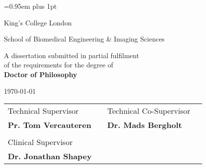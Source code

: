 \begin{titlepage}

\pagestyle{empty}


\vspace*{1.5cm}

\begin{center}
	{\LARGE{\theauthor}\par}
\end{center}
\vspace{0.6cm}
\begin{center}
        {\huge\baselineskip=0.95em plus 1pt \expandafter{
        \textbf{\thetitle}
        \par}}
\end{center}


\vspace{3cm}

\begin{center}
	\LARGE{\expandafter{\textrm{King's College London}}}\par
	\expandafter{\Large{School of Biomedical Engineering \& Imaging Sciences}\par}
\end{center}

\vspace{1.5cm}

\begin{center}
	A dissertation submitted in partial fulfilment 
	\\
	of the requirements for the degree of
	\\ 
	\textbf{Doctor of Philosophy}	
\end{center}

\vspace{0.2cm}
\begin{center}
	\today
\end{center}

\vspace{1.0cm}

\begin{center}
\begin{tabular}{l p{3.3cm} l l}
	
Technical Supervisor & & Technical Co-Supervisor \\
\textbf{Pr. Tom Vercauteren} & & \textbf{Dr. Mads Bergholt}  \\
 & & \\
Clinical Supervisor & & \\
\textbf{Dr. Jonathan Shapey} & & 
	
\end{tabular}
\end{center}

\end{titlepage} 